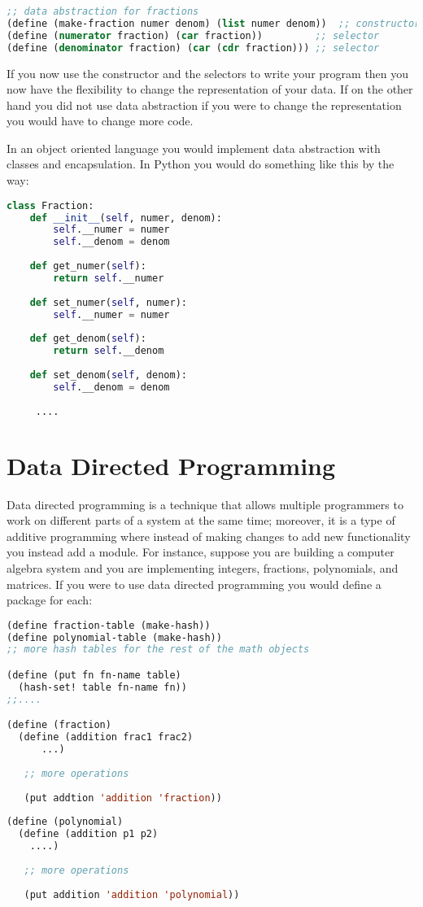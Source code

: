 \documentclass{amsbook}
\begin{document}
\begin{lstlisting}[language=Lisp]
;; data abstraction for fractions
(define (make-fraction numer denom) (list numer denom))  ;; constructor
(define (numerator fraction) (car fraction))         ;; selector
(define (denominator fraction) (car (cdr fraction))) ;; selector
\end{lstlisting}

If you now use the constructor and the selectors to write your program then you now have the flexibility to change the representation of your data. If on the other hand you did not use data abstraction if you were to change the representation you would have to change more code.

In an object oriented language you would implement data abstraction with classes and encapsulation. In Python you would do something like this by the way:

\begin{lstlisting}[language=Python]
class Fraction:
    def __init__(self, numer, denom):
        self.__numer = numer
        self.__denom = denom
        
    def get_numer(self):
        return self.__numer
        
    def set_numer(self, numer):
        self.__numer = numer
        
    def get_denom(self):
        return self.__denom
        
    def set_denom(self, denom):
        self.__denom = denom
     
     ....
\end{lstlisting}
\section{Data Directed Programming}

Data directed programming is a technique that allows multiple programmers to work on different parts of a system at the same time; moreover, it is a type of additive programming where instead of making changes to add new functionality you instead add a module. For instance, suppose you are building a computer algebra system and you are implementing integers, fractions, polynomials, and matrices. If you were to use data directed programming you would define a package for each:

\begin{lstlisting}[language=Lisp]
(define fraction-table (make-hash))
(define polynomial-table (make-hash))
;; more hash tables for the rest of the math objects

(define (put fn fn-name table)
  (hash-set! table fn-name fn))
;;....

(define (fraction)
  (define (addition frac1 frac2)
      ...)
      
   ;; more operations
   
   (put addtion 'addition 'fraction))
   
(define (polynomial)
  (define (addition p1 p2)
    ....)
    
   ;; more operations
   
   (put addition 'addition 'polynomial))

\end{lstlisting}
\end{document}
